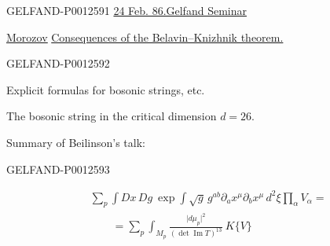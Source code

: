 \begin{GelfandAdjacentEvidence}{GELFAND-P001259}{1}
\underline{24 Feb. 86.}\qquad\underline{Gelfand Seminar}

\underline{\underline{Morozov}}\qquad
\underline{Consequences of the Belavin–Knizhnik theorem.}
\end{GelfandAdjacentEvidence}
\begin{GelfandAdjacentEvidence}{GELFAND-P001259}{2}


Explicit formulas for bosonic strings, etc.

The bosonic string in the critical dimension $d=26$.

Summary of Beilinson's talk:
\end{GelfandAdjacentEvidence}
\begin{GelfandAdjacentEvidence}{GELFAND-P001259}{3}

\begin{equation*}
\begin{aligned}
&\sum_p\int Dx\,Dg\ \exp\int\sqrt g\,g^{ab}\partial_a x^\mu\partial_b x^\mu\,d^2\xi\prod_\alpha V_\alpha={}\\
&\qquad=\sum_p\int_{M_p}\frac{\lvert d\mu_p\rvert^2}{(\det\operatorname{Im}T)^{13}}\ K\{V\}
\end{aligned}\tag{1}
\end{equation*}
\end{GelfandAdjacentEvidence}
